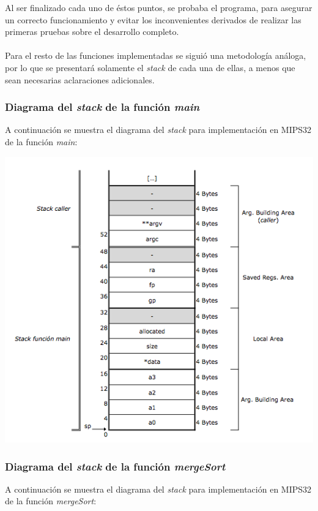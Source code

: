 \documentclass[a4paper,10pt]{article}
\begin{document}
Al ser finalizado cada uno de \'estos puntos, se probaba el programa, para asegurar un correcto funcionamiento y evitar los inconvenientes derivados de realizar las primeras pruebas sobre el desarrollo completo.\\
\\Para el resto de las funciones implementadas se sigui\'o una metodolog\'ia an\'aloga, por lo que se presentar\'a solamente el \textit{stack} de cada una de ellas, a menos que sean necesarias aclaraciones adicionales.

\pagebreak

\subsubsection{Diagrama del \textit{stack} de la funci\'on \textit{main}}
A continuaci\'on se muestra el diagrama del \textit{stack} para implementaci\'on en MIPS32 de la funci\'on \textit{main}:

\begin{center}
\includegraphics[scale=0.50]{stack_main.png}
\end{center}

\pagebreak

\subsubsection{Diagrama del \textit{stack} de la funci\'on \textit{mergeSort}}
A continuaci\'on se muestra el diagrama del \textit{stack} para implementaci\'on en MIPS32 de la funci\'on \textit{mergeSort}:
\end{document}
